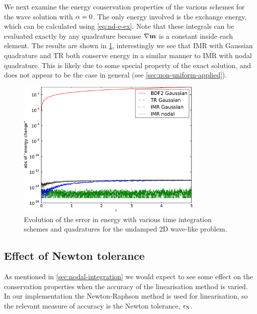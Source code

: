 We next examine the energy conservation properties of the various schemes for the wave solution with $\alpha = 0$.
The only energy involved is the exchange energy, which can be calculated using \cref{eq:nd-e-ex}.
Note that these integrals can be evaluated exactly by any quadrature because $\nabla \boldsymbol{\mathrm{m}}$ is a constant inside each element.
The results are shown in \cref{fig:energy-error-2d}, interestingly we see that IMR with Gaussian quadrature and TR both conserve energy in a similar manner to IMR with nodal quadrature.
This is likely due to some special property of the exact solution, and does not appear to be the case in general (see \cref{sec:non-uniform-applied}).
\begin{figure}
  \centering
  \includegraphics[width=0.8\textwidth]{plots/2d_wave_solution_energy/absofenergychangevstimes}
  \caption{Evolution of the error in energy with various time integration schemes and quadratures for the undamped 2D wave-like problem.
}
  \label{fig:energy-error-2d}
\end{figure}


\subsection{Effect of Newton tolerance}
\label{sec:effect-newt-toler-m-conservation}

As mentioned in \cref{sec:nodal-integration} we would expect to see some effect on the conservation properties when the accuracy of the linearisation method is varied.
In our implementation the Newton-Raphson method is used for linearisation, so the relevant measure of accuracy is the Newton tolerance, $\epsilon_{\mathrm{N}}$.

